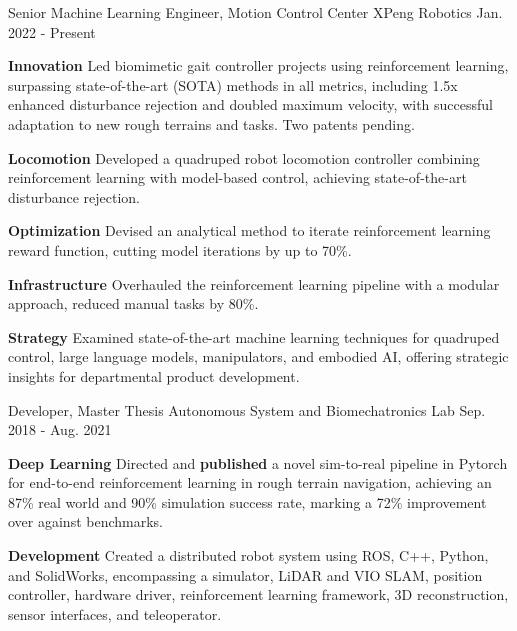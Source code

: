 \begin{cventries}
	\cventry
	{Senior Machine Learning Engineer, Motion Control Center}
	{XPeng Robotics}
	{Jan. 2022 - Present}
	{}
	{
		\begin{cvitems}
			\item {
				\textbf{Innovation} Led biomimetic gait controller projects using reinforcement learning, surpassing state-of-the-art (SOTA) methods in all metrics, including 1.5x enhanced disturbance rejection and doubled maximum velocity, with successful adaptation to new rough terrains and tasks. Two patents pending.
			}
			\item {
				\textbf{Locomotion} Developed a quadruped robot locomotion controller combining reinforcement learning with model-based control, achieving state-of-the-art disturbance rejection.
			}
			\item {
				\textbf{Optimization} Devised an analytical method to iterate reinforcement learning reward function, cutting model iterations by up to 70\%.
			}
			\item {
				\textbf{Infrastructure} Overhauled the reinforcement learning pipeline with a modular approach, reduced manual tasks by 80\%.
			}
			\item {
				\textbf{Strategy} Examined state-of-the-art machine learning techniques for quadruped control, large language models, manipulators, and embodied AI, offering strategic insights for departmental product development.
			}
		\end{cvitems}
	}
	\cventry
	{Developer, Master Thesis}
	{Autonomous System and Biomechatronics Lab}
	{Sep. 2018 - Aug. 2021}
	{}
	{
		\begin{cvitems}
			\item {
				\textbf{Deep Learning} Directed and \textbf{published} a novel sim-to-real pipeline  in Pytorch for end-to-end reinforcement learning in rough terrain navigation, achieving an 87\% real world and 90\% simulation success rate, marking a 72\% improvement over against benchmarks.
			}
			\item {
				\textbf{Development} Created a distributed robot system using ROS, C++, Python, and SolidWorks, encompassing a simulator, LiDAR and VIO SLAM, position controller, hardware driver, reinforcement learning framework, 3D reconstruction, sensor interfaces, and teleoperator.
}
\end{cvitems}}
\end{cventries}
